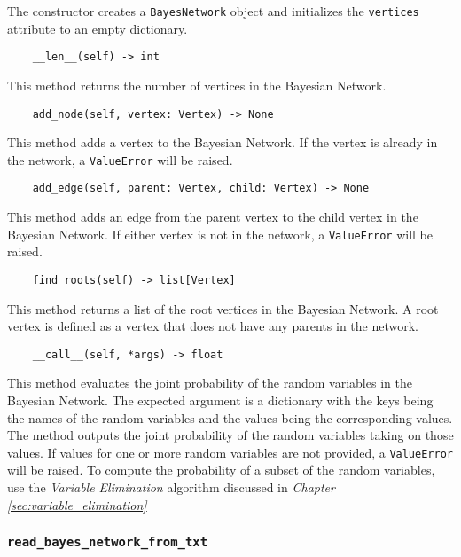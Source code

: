 \documentclass{article}
\theoremstyle{definition}
\begin{document}
The constructor creates a \texttt{BayesNetwork} object and initializes the \texttt{vertices} attribute to an empty dictionary.

\begin{verbatim}
    __len__(self) -> int
\end{verbatim}

This method returns the number of vertices in the Bayesian Network.

\begin{verbatim}
    add_node(self, vertex: Vertex) -> None
\end{verbatim}

This method adds a vertex to the Bayesian Network. If the vertex is already in the network, a \texttt{ValueError} will be raised.

\begin{verbatim}
    add_edge(self, parent: Vertex, child: Vertex) -> None
\end{verbatim}

This method adds an edge from the parent vertex to the child vertex in the Bayesian Network. If either vertex is not in the network, a \texttt{ValueError} will be raised.

\begin{verbatim}
    find_roots(self) -> list[Vertex]
\end{verbatim}

This method returns a list of the root vertices in the Bayesian Network. A root vertex is defined as a vertex that does not have any parents in the network.

\begin{verbatim}
    __call__(self, *args) -> float
\end{verbatim}

This method evaluates the joint probability of the random variables in the Bayesian Network. The expected argument is a dictionary with the keys being the names of the random variables and the values being the corresponding values. The method outputs the joint probability of the random variables taking on those values. If values for one or more random variables are not provided, a \texttt{ValueError} will be raised. To compute the probability of a subset of the random variables, use the \textit{Variable Elimination} algorithm discussed in \textit{Chapter \ref{sec:variable_elimination}}

\subsubsection{\texttt{read\_bayes\_network\_from\_txt}}
\end{document}
